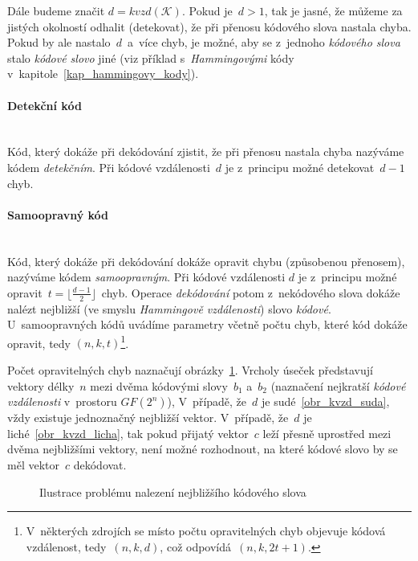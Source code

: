 \documentclass[thesis=M,czech,hidelinks]{FITthesis}[2012/06/26]
\newcommand{\0}{{\textcolor[gray]{0.75}{0}}}
\begin{document}
Dále budeme značit $d = kvzd(\mathcal{K})$. Pokud je~$d > 1$, tak je jasné, že
můžeme za jistých okolností odhalit (detekovat), že při přenosu kódového slova
nastala chyba. Pokud by ale nastalo~$d$~a~více chyb, je možné, aby se z~jednoho
\emph{kódového slova} stalo \emph{kódové slovo} jiné (viz příklad
s~\emph{Hammingovými} kódy v~kapitole~\ref{kap_hammingovy_kody}).

\paragraph{Detekční kód} \hfil \\
Kód, který dokáže při dekódování zjistit, že při přenosu nastala chyba nazýváme
kódem \emph{detekčním}. Při kódové vzdálenosti~$d$ je z~principu možné
detekovat~$d-1$ chyb.

\paragraph{Samoopravný kód} \hfil \\
Kód, který dokáže při dekódování dokáže opravit chybu (způsobenou přenosem),
nazýváme kódem \emph{samoopravným}. Při kódové vzdálenosti $d$ je z~principu
možné opravit~$t = \lfloor \frac{d-1}{2} \rfloor$~chyb. Operace
\emph{dekódování} potom z~nekódového slova dokáže nalézt nejbližší (ve smyslu
\emph{Hammingově vzdálenosti}) slovo \emph{kódové}. U~samoopravných kódů uvádíme
parametry včetně počtu chyb, které kód dokáže opravit, tedy $(n,k,t)$\footnote{
    V~některých zdrojích se místo počtu opravitelných chyb objevuje kódová
    vzdálenost, tedy~$(n,k,d)$, což odpovídá~$(n,k,2t+1)$.
}.


Počet opravitelných chyb naznačují obrázky~\ref{obr_kvzd}. Vrcholy úseček
představují vektory délky~$n$ mezi dvěma kódovými slovy~$b_1$ a~$b_2$ (naznačení
nejkratší \emph{kódové vzdálenosti} v~prostoru $GF(2^n)$), V~případě, že~$d$ je
sudé~\ref{obr_kvzd_suda}, vždy existuje jednoznačný nejbližší vektor. V~případě,
že~$d$ je liché~\ref{obr_kvzd_licha}, tak pokud přijatý vektor~$c$ leží přesně
uprostřed mezi dvěma nejbližšími vektory, není možné rozhodnout, na které kódové
slovo by se měl vektor~$c$ dekódovat.

\begin{figure}
    \centering
    \quad
    \label{obr_kvzd}
    \caption{Ilustrace problému nalezení nejbližšího kódového slova}
\end{figure}
\end{document}
